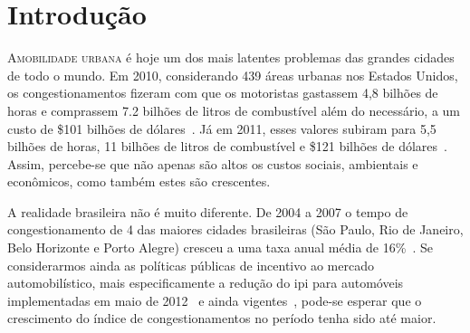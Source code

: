 \chapter{Introdução}
\label{chp:Introdução}

\lettrine{A}{mobilidade urbana} é hoje um dos mais latentes problemas das grandes cidades de todo o mundo. Em 2010, considerando 439 áreas urbanas nos Estados Unidos, os congestionamentos fizeram com que os motoristas gastassem 4,8 bilhões de horas e comprassem 7.2 bilhões de litros de combustível além do necessário, a um custo de \$101 bilhões de dólares~\cite{Eisele2011}. Já em 2011, esses valores subiram para 5,5 bilhões de horas, 11 bilhões de litros de combustível e \$121 bilhões de dólares~\cite{Schrank2012}. 
Assim, percebe-se que não apenas são altos os custos sociais, ambientais e econômicos, como também estes são crescentes.

A realidade brasileira não é muito diferente. De 2004 a 2007 o tempo de congestionamento de 4 das maiores cidades brasileiras (São Paulo, Rio de Janeiro, Belo Horizonte e Porto Alegre) cresceu a uma taxa anual média de 16\%~\cite{resende2009}. Se considerarmos ainda as políticas públicas de incentivo ao mercado automobilístico, mais especificamente a redução do \gls{ipi} para automóveis implementadas em maio de 2012~\cite{brasil2011} e ainda vigentes~\cite{brasil2012}, pode-se esperar que o crescimento do índice de congestionamentos no período tenha sido até maior.

